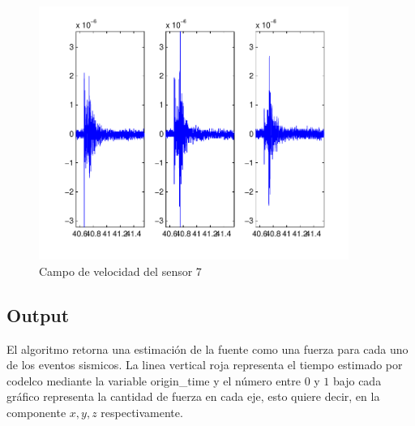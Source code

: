 \begin{figure}[H]
\includegraphics[width=0.9\textwidth,height=0.4\textheight]{linea_timerev/figuras/plotSensor(Ev(1),7).pdf}
\caption{Campo de velocidad del sensor 7}
\end{figure}


\subsection{Output}

El algoritmo retorna una estimación de la fuente como una fuerza para cada uno de
los eventos sismicos. La linea vertical roja representa el tiempo estimado por
codelco mediante la variable origin\_time y el número entre $0$ y $1$ bajo
cada gráfico representa la cantidad de fuerza en cada eje, esto quiere decir,
en la componente $x,y,z$ respectivamente.

